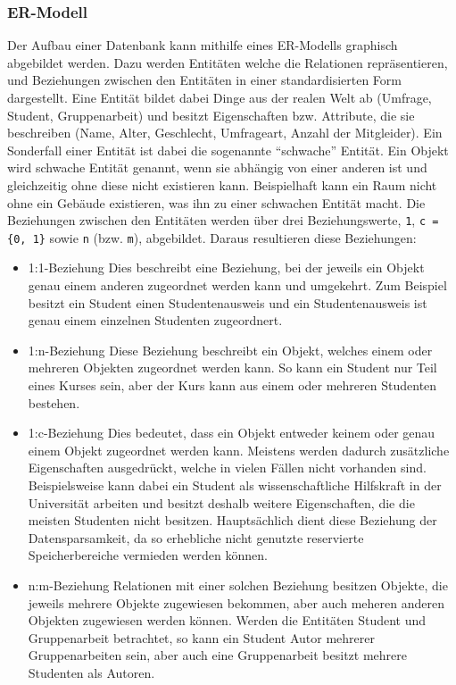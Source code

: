 \subsubsection{\acl{ER-Modell}}
Der Aufbau einer Datenbank kann mithilfe eines \acs{ER-Modell}s graphisch abgebildet werden. 
Dazu werden Entitäten  welche die Relationen repräsentieren, und Beziehungen  zwischen den Entitäten in einer standardisierten Form dargestellt.
Eine Entität bildet dabei Dinge aus der realen Welt ab (Umfrage, Student, Gruppenarbeit) und besitzt Eigenschaften bzw. Attribute, die sie beschreiben (Name, Alter, Geschlecht, Umfrageart, Anzahl der Mitgleider).
Ein Sonderfall einer Entität ist dabei die sogenannte \enquote{schwache} Entität.
Ein Objekt wird schwache Entität genannt, wenn sie abhängig von einer anderen ist und gleichzeitig ohne diese nicht existieren kann.
Beispielhaft kann ein Raum nicht ohne ein Gebäude existieren, was ihn zu einer schwachen Entität macht. 
Die Beziehungen zwischen den Entitäten werden über drei Beziehungswerte, \texttt{1}, \texttt{c = \{0, 1\}} sowie \texttt{n} (bzw. \texttt{m}), abgebildet.
Daraus resultieren diese Beziehungen:

\begin{itemize}
    \item 1:1-Beziehung \newline
    Dies beschreibt eine Beziehung, bei der jeweils ein Objekt genau einem anderen zugeordnet werden kann und umgekehrt.
    Zum Beispiel besitzt ein Student einen Studentenausweis und ein Studentenausweis ist genau einem einzelnen Studenten zugeordnert.
    \item 1:n-Beziehung \newline
    Diese Beziehung beschreibt ein Objekt, welches einem oder mehreren Objekten zugeordnet werden kann.
    So kann ein Student nur Teil eines Kurses sein, aber der Kurs kann aus einem oder mehreren Studenten bestehen.
    \item 1:c-Beziehung \newline
    Dies bedeutet, dass ein Objekt entweder keinem oder genau einem Objekt zugeordnet werden kann.
    Meistens werden dadurch zusätzliche Eigenschaften ausgedrückt, welche in vielen Fällen nicht vorhanden sind.
	Beispielsweise kann dabei ein Student als wissenschaftliche Hilfskraft in der Universität arbeiten und besitzt deshalb weitere Eigenschaften, die die meisten Studenten nicht besitzen.
	Hauptsächlich dient diese Beziehung der Datensparsamkeit, da so erhebliche nicht genutzte reservierte Speicherbereiche vermieden werden können.
    \item n:m-Beziehung \newline
    Relationen mit einer solchen Beziehung besitzen Objekte, die jeweils mehrere Objekte zugewiesen bekommen, aber auch meheren anderen Objekten zugewiesen werden können.
    Werden die Entitäten Student und Gruppenarbeit betrachtet, so kann ein Student Autor mehrerer Gruppenarbeiten sein, aber auch eine Gruppenarbeit besitzt mehrere Studenten als Autoren.
\end{itemize}

